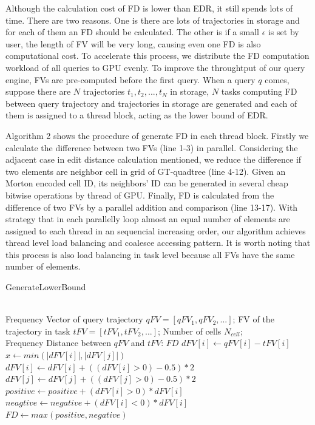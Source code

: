 \documentclass[conference]{IEEEtran}
\begin{document}
Although the calculation cost of FD is lower than EDR, it still spends lots of time. There are two reasons. One is there are lots of trajectories in storage and for each of them an FD should be calculated. The other is if a small $\epsilon$ is set by user, the length of FV will be very long, causing even one FD is also computational cost. To accelerate this process, we distribute the FD computation workload of all queries to GPU evenly. To improve the throughtput of our query engine, FVs are pre-computed before the first query. When a query $q$ comes, suppose there are $N$ trajectories $t_{1},t_{2},...,t_{N}$ in storage, $N$ tasks computing FD between query trajectory and trajectories in storage are generated and each of them is assigned to a thread block, acting as the lower bound of EDR. 

Algorithm 2 shows the procedure of generate FD in each thread block. Firstly we calculate the difference between two FVs (line 1-3) in parallel. Considering the adjacent case in edit distance calculation mentioned, we reduce the difference if two elements are neighbor cell in grid of GT-quadtree (line 4-12). Given an Morton encoded cell ID, its neighbors' ID can be generated in several cheap bitwise operations by thread of GPU. Finally, FD is calculated from the difference of two FVs by a parallel addition and comparison (line 13-17). With strategy that in each parallelly loop almost an equal number of elements are assigned to each thread in an sequencial increasing order, our algorithm achieves thread level load balancing and coalesce accessing pattern. It is worth noting that this process is also load balancing in task level because all FVs have the same number of elements.

\begin{algorithm}[htb]
	\caption{GenerateLowerBound}
	\label{alg:GetLB}
	\begin{algorithmic}[1]
		\REQUIRE ~~\\
		Frequency Vector of query trajectory $qFV=[qFV_{1},qFV_{2},...]$; FV of the trajectory in task $tFV=[tFV_{1},tFV_{2},...]$; Number of cells $N_{cell}$;
		\ENSURE ~~\\
		Frequency Distance between $qFV$ and $tFV$: $FD$
		\STATE $dFV[i] \leftarrow qFV[i]-tFV[i]$
		\ENDFOR
		\STATE $x \leftarrow min(|dFV[i]|,|dFV[j]|)$
		\STATE $dFV[i] \leftarrow dFV[i] + ((dFV[i]>0)-0.5)*2$
		\STATE $dFV[j] \leftarrow dFV[j] + ((dFV[j]>0)-0.5)*2$
		\ENDIF
		\ENDFOR
		\ENDFOR
		\STATE $positive \leftarrow positive+(dFV[i]>0)*dFV[i]$
		\STATE $neagtive \leftarrow negative+(dFV[i]<0)*dFV[i]$
		\ENDFOR
		\STATE $FD \leftarrow max(positive,negative)$
	\end{algorithmic}
\end{algorithm}
\end{document}
